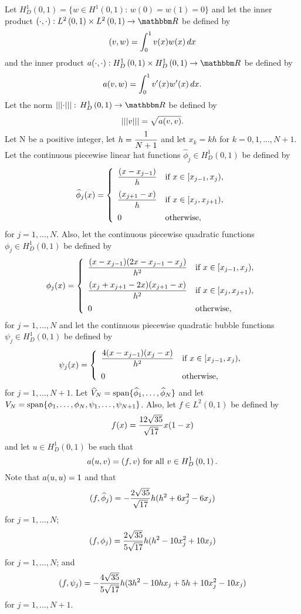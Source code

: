 Let $H^1_D\left(0,1\right)=\{w\in H^1(0,1):\,w(0)=w(1)=0\}$ and let the inner product $\ip{\cdot,\cdot}:L^2\left(0,1\right)\times L^2\left(0,1\right)\to\R$ be defined by
\[
(v,w)=\int_0^1v(x)w(x)\,dx
\]
and the inner product $a\ip{\cdot,\cdot}:H^1_D\left(0,1\right)\times H^1_D\left(0,1\right)\to\R$ be defined by
\[
a(v,w)=\int_0^1v'(x)w'(x)\,dx.
\]
Let the norm $\left|\left|\left|\cdot\right|\right|\right|:\,H^1_D\left(0,1\right)\to\R$ be defined by
\[
\left|\left|\left|v\right|\right|\right|=\sqrt{a(v,v)}.
\]
Let N be a positive integer, let $\displaystyle{h={1 \over N+1}}$ and let $x_k=kh$ for $k=0,1,\ldots,N+1$. Let the continuous piecewise linear hat functions $\widehat{\phi}_j\in H^1_D\left(0,1\right)$ be defined by
\[
\widehat{\phi}_j(x) = \left\{\begin{array}{ll}
\displaystyle{{(x-x_{j-1}) \over h}} & \displaystyle{\mbox{if }x\in[x_{j-1},x_j)},
\\[10pt]
\displaystyle{{(x_{j+1}-x) \over h}} & \displaystyle{\mbox{if }x\in[x_j,x_{j+1})},
\\[10pt]
0 & \mbox{otherwise},
\end{array}\right.
\]
for $j=1,\ldots,N$. Also, let the continuous piecewise quadratic functions $\phi_j\in H^1_D\left(0,1\right)$ be defined by
\[
\phi_j(x)=\left\{\begin{array}{ll}
\displaystyle{{(x-x_{j-1})(2x-x_{j-1}-x_j) \over h^2}} & \displaystyle{\mbox{if }x\in[x_{j-1},x_j)},
\\[10pt]
\displaystyle{{(x_j+x_{j+1}-2x)(x_{j+1}-x) \over h^2}} & \displaystyle{\mbox{if }x\in[x_j,x_{j+1})},
\\[10pt]
0 & \mbox{otherwise},
\end{array}\right.
\]
for $j=1,\ldots,N$ and let the continuous piecewise quadratic bubble functions $\psi_j\in H^1_D\left(0,1\right)$ be defined by
\[
\psi_j(x)=\left\{\begin{array}{ll}
\displaystyle{{4(x-x_{j-1})(x_j-x) \over h^2}} & \displaystyle{\mbox{if }x\in[x_{j-1},x_j)},
\\[10pt]
0 & \mbox{otherwise},
\end{array}\right.
\]
for $j=1,\ldots,N+1$. Let $\widehat{V}_N={\rm span}\{\widehat{\phi}_1,\ldots,\widehat{\phi}_N\}$ and let $V_N={\rm span}\{\phi_1,\ldots,\phi_N,\psi_1,\ldots,\psi_{N+1}\}$. Also, let $f\in L^2\left(0,1\right)$ be defined by
\[
f(x)={12\sqrt{35} \over \sqrt{17}}x(1-x)
\]
and let $u\in H^1_D\left(0,1\right)$ be such that
\[
a(u,v)=(f,v)\mbox{ for all }v\in H^1_D\left(0,1\right).
\]
Note that $a(u,u)=1$ and that
\[
(f,\widehat{\phi}_j)=-{2\sqrt{35} \over \sqrt{17}}h(h^2+6x_j^2 - 6x_j)
\]
for $j=1,\ldots,N$;
\[
(f,\phi_j)={2\sqrt{35} \over 5\sqrt{17}}h(h^2-10x_j^2+10x_j)
\]
for $j=1,\ldots,N$; and
\[
(f,\psi_j)=-{4\sqrt{35} \over 5\sqrt{17}}h(3h^2-10hx_j+5h+10x_j^2-10x_j)
\]
for $j=1,\ldots,N+1$.


